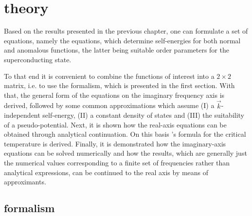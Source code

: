 
\chapter{ theory}

Based on the results presented in the previous chapter, one can formulate a set
of equations, namely the  equations, which determine
self-energies for both normal and anomalous  functions, the latter
being suitable order parameters for the superconducting state.

To that end it is convenient to combine the  functions of interest
into a $2 \times 2$ matrix, i.e. to use the  formalism, which is
presented in the first section. With that, the general form of the
 equations on the imaginary frequency axis is derived, followed
by some common approximations which assume (I) a $\vec k$-independent
self-energy, (II) a constant density of states and (III) the suitability of a
 pseudo-potential. Next, it is shown how the real-axis equations
can be obtained through analytical continuation. On this basis 's
formula for the critical temperature is derived. Finally, it is demonstrated how
the imaginary-axis equations can be solved numerically and how the results,
which are generally just the numerical values corresponding to a finite set of
 frequencies rather than analytical expressions, can be
continued to the real axis by means of  approximants.

\section{ formalism}

